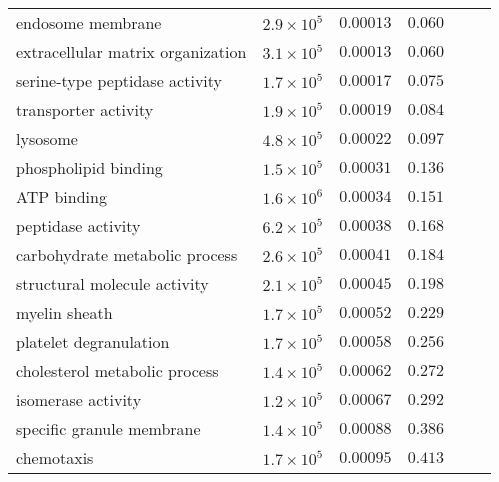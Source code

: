 \begin{longtable}{|l|r|r|r|r|r|}
    endosome membrane                         & $2.9\times 10^{5}$ & $0.00013$            & $ 0.060~~$                      \\
    extracellular matrix organization         & $3.1\times 10^{5}$ & $0.00013$            & $ 0.060~~$                      \\
    serine-type peptidase activity            & $1.7\times 10^{5}$ & $0.00017$            & $ 0.075~~$                      \\
    transporter activity                      & $1.9\times 10^{5}$ & $0.00019$            & $ 0.084~~$                      \\
    lysosome                                  & $4.8\times 10^{5}$ & $0.00022$            & $ 0.097~~$                      \\
    phospholipid binding                      & $1.5\times 10^{5}$ & $0.00031$            & $ 0.136~~$                      \\
    ATP binding                               & $1.6\times 10^{6}$ & $0.00034$            & $ 0.151~~$                      \\
    peptidase activity                        & $6.2\times 10^{5}$ & $0.00038$            & $ 0.168~~$                      \\
    carbohydrate metabolic process            & $2.6\times 10^{5}$ & $0.00041$            & $ 0.184~~$                      \\
    structural molecule activity              & $2.1\times 10^{5}$ & $0.00045$            & $ 0.198~~$                      \\
    myelin sheath                             & $1.7\times 10^{5}$ & $0.00052$            & $ 0.229~~$                      \\
    platelet degranulation                    & $1.7\times 10^{5}$ & $0.00058$            & $ 0.256~~$                      \\
    cholesterol metabolic process             & $1.4\times 10^{5}$ & $0.00062$            & $ 0.272~~$                      \\
    isomerase activity                        & $1.2\times 10^{5}$ & $0.00067$            & $ 0.292~~$                      \\
    specific granule membrane                 & $1.4\times 10^{5}$ & $0.00088$            & $ 0.386~~$                      \\
    chemotaxis                                & $1.7\times 10^{5}$ & $0.00095$            & $ 0.413~~$                      \\

\end{longtable}
